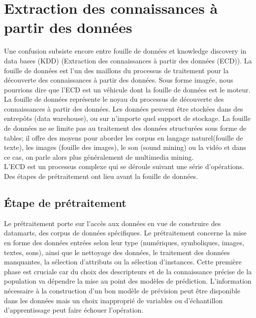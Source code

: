 \documentclass[runningheads,a4paper]{llncs}
\begin{document}
\section{Extraction des connaissances à partir des données}
Une  confusion  subsiste  encore  entre fouille de données et knowledge  discovery  in  data  bases (KDD) (Extraction des connaissances à partir des données (ECD)). La fouille de données est l’un des maillons du processus de traitement pour la découverte des connaissances à partir des données. Sous forme imagée, nous pourrions dire que l’ECD est un véhicule dont la fouille de données est le moteur. \\
La fouille de données représente le noyau du processus de découverte des connaissances à partir des données. Les données  peuvent  être  stockées  dans  des  entrepôts (data  warehouse),  ou sur n'importe quel support de stockage. La fouille de données ne se limite pas   au   traitement   des   données   structurées   sous   forme   de   tables; il offre des moyens pour aborder les corpus en langage naturel(fouille de texte), les images (fouille des images), le son (sound mining) ou la vidéo et dans ce cas, on parle alors plus généralement de multimedia mining.\\
L’ECD  est  un  processus  complexe  qui  se  déroule  suivant  une  série d’opérations. Des étapes de prétraitement ont lieu avant la fouille de données. 
\subsection{Étape de prétraitement}
Le  prétraitement porte sur l’accès aux données en vue de construire des datamarts, des   corpus   de   données spécifiques. Le prétraitement  concerne  la  mise  en  forme  des  données  entrées  selon  leur  type (numériques,  symboliques,  images,  textes,  sons),  ainsi  que  le  nettoyage  des  données, le traitement des données manquantes, la sélection d’attributs ou la sélection d’instances. Cette première phase est cruciale car du choix des descripteurs  et  de  la  connaissance  précise  de  la  population  va  dépendre  la mise au point des modèles de prédiction. L’information nécessaire à la construction d’un bon modèle de prévision peut être disponible dans les données  mais  un  choix  inapproprié  de  variables  ou  d’échantillon d’apprentissage peut faire échouer l’opération.
\end{document}

